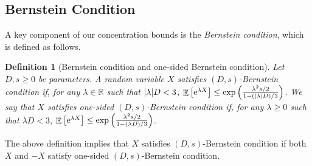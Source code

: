 \documentclass[letterpaper,11pt]{article}
\newtheorem{definition}[theorem]{Definition}
\DeclareMathOperator*{\E}{\mathbb{E}}
\newcommand{\e}{\mathrm{e}}
\newcommand{\bounded}{D}
\newcommand{\variance}{s}
\begin{document}
\subsection{Bernstein Condition} \label{sec:bernstein condition}
  A key component of our concentration bounds is the \emph{Bernstein condition}, which is defined as follows.
    \begin{definition}[Bernstein condition and one-sided Bernstein condition]
    \label{def:Bernstein condition}
    Let $\bounded,\variance\ge 0$ be parameters.
    A random variable $X$ satisfies \emph{$(\bounded,\variance)$-Bernstein condition} if,
    for any $\lambda\in \mathbb{R}$ such that $\abs{\lambda} \bounded < 3$, 
    $\E\qty[ \e^{\lambda X} ]  \le \exp\qty( \frac{\lambda^2 \variance / 2}{1- (\abs{\lambda}\bounded)/3})$.
    We say that $X$ satisfies \emph{one-sided} $(\bounded,\variance)$-Bernstein condition if,
    for any $\lambda\geq 0$ such that $\lambda \bounded < 3$, 
    $\E\qty[ \e^{\lambda X} ]  \le \exp\qty( \frac{\lambda^2 \variance / 2}{1- (\lambda\bounded)/3})$.
    \end{definition}
  The above definition implies that $X$ satisfies $(\bounded,\variance)$-Bernstein condition if both $X$ and $-X$ satisfy one-sided $(\bounded,\variance)$-Bernstein condition.
\end{document}

